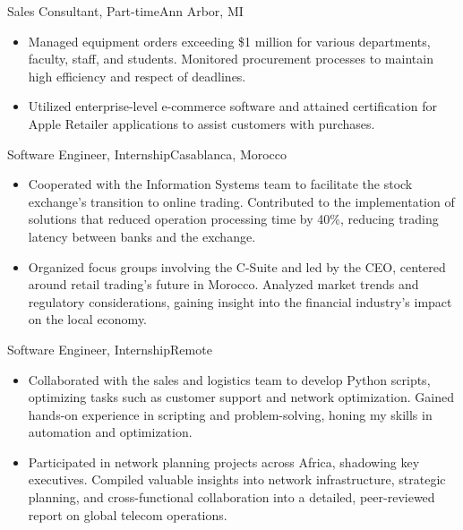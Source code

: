 \documentclass[letterpaper,10.5pt]{article}
\begin{document}
{Sales Consultant, Part-time}{Ann Arbor, MI}
\begin{itemize}
    \item Managed equipment orders exceeding \$1 million for various departments, faculty, staff, and students. Monitored procurement processes to maintain high efficiency and respect of deadlines.
    
    \item Utilized enterprise-level e-commerce software and attained certification for Apple Retailer applications to assist customers with purchases.
\end{itemize}

{Software Engineer, Internship}{Casablanca, Morocco}
\begin{itemize}
    \item Cooperated with the Information Systems team to facilitate the stock exchange’s transition to online trading. Contributed to the implementation of solutions that reduced operation processing time by 40\%, reducing trading latency between banks and the exchange.
    
    \item Organized focus groups involving the C-Suite and led by the CEO, centered around retail trading's future in Morocco. Analyzed market trends and regulatory considerations, gaining insight into the financial industry's impact on the local economy.
\end{itemize}
{Software Engineer, Internship}{Remote}
\begin{itemize}
    \item Collaborated with the sales and logistics team to develop Python scripts, optimizing tasks such as customer support and network optimization. Gained hands-on experience in scripting and problem-solving, honing my skills in automation and optimization.
    
    \item Participated in network planning projects across Africa, shadowing key executives. Compiled valuable insights into network infrastructure, strategic planning, and cross-functional collaboration into a detailed, peer-reviewed report on global telecom operations.

\end{itemize}
\end{document}

